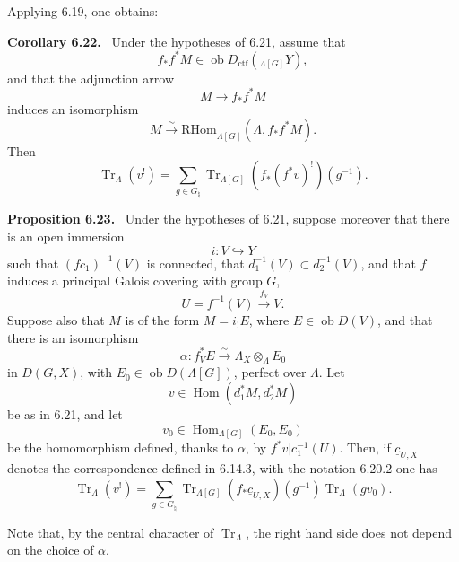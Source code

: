 \documentclass[11pt]{article}
\newenvironment{statement}[1]{\par\medskip\noindent\textbf{#1.}\ }{\par\medskip}
\DeclareMathOperator{\Hom}{Hom}
\providecommand{\Tr}{\operatorname{Tr}}
\providecommand{\Tr}{\operatorname{Tr}}
\providecommand{\Ob}{\operatorname{ob}}
\providecommand{\Tr}{\operatorname{Tr}}
\providecommand{\Hom}{\operatorname{Hom}}
\providecommand{\Ob}{\operatorname{ob}}
\providecommand{\Tr}{\operatorname{Tr}}
\providecommand{\Ob}{\operatorname{Ob}}
\providecommand{\Hom}{\operatorname{Hom}}
\providecommand{\Tr}{\operatorname{Tr}}
\providecommand{\Ob}{\operatorname{ob}}
\providecommand{\Ob}{\operatorname{Ob}}
\begin{document}
Applying 6.19, one obtains:

\begin{statement}{Corollary 6.22}
Under the hypotheses of 6.21, assume that
\[
f_*f^*M\in\Ob D_{\mathrm{ctf}}({}_{\Lambda[G]}Y),
\]
and that the adjunction arrow
\[
M\to f_*f^*M
\]
induces an isomorphism
\[
M\xrightarrow{\sim}\mathrm{R}\underline{\mathrm{Hom}}_{\Lambda[G]}(\Lambda,f_*f^*M).
\]
Then
\begin{equation}
\Tr_{\Lambda}(v^!)=
\sum_{g\in G_{\natural}}\Tr_{\Lambda[G]}(f_*(f^*v)^!)(g^{-1}).
\tag{6.22.1}
\end{equation}
\end{statement}

\begin{statement}{Proposition 6.23}
Under the hypotheses of 6.21, suppose moreover that there is an open immersion
\[
i:V\hookrightarrow Y
\]
such that $(fc_1)^{-1}(V)$ is connected, that $d_1^{-1}(V)\subset d_2^{-1}(V)$, and that $f$ induces a principal Galois covering with group $G$,
\[
U=f^{-1}(V)\xrightarrow{f_V}V.
\]
Suppose also that $M$ is of the form $M=i_!E$, where $E\in\Ob D(V)$, and that there is an isomorphism
\[
\alpha:f_V^*E\xrightarrow{\sim}\Lambda_X\otimes_{\Lambda}E_0
\]
in $D(G,X)$, with $E_0\in\Ob D(\Lambda[G])$, perfect over $\Lambda$. Let
\[
v\in\Hom(d_1^*M,d_2^*M)
\]
be as in 6.21, and let
\[
v_0\in\Hom_{\Lambda[G]}(E_0,E_0)
\]
be the homomorphism defined, thanks to $\alpha$, by $f^*v|c_1^{-1}(U)$. Then, if $\underline c_{U,X}$ denotes the correspondence defined in 6.14.3, with the notation 6.20.2 one has
\begin{equation}
\Tr_{\Lambda}(v^!)
=
\sum_{g\in G_{\natural}}
\Tr_{\Lambda[G]}(f_*\underline c_{U,X})(g^{-1})\Tr_{\Lambda}(gv_0).
\tag{6.23.1}
\end{equation}
\end{statement}

Note that, by the central character of $\Tr_{\Lambda}$, the right hand side does not depend on the choice of $\alpha$.
\end{document}
